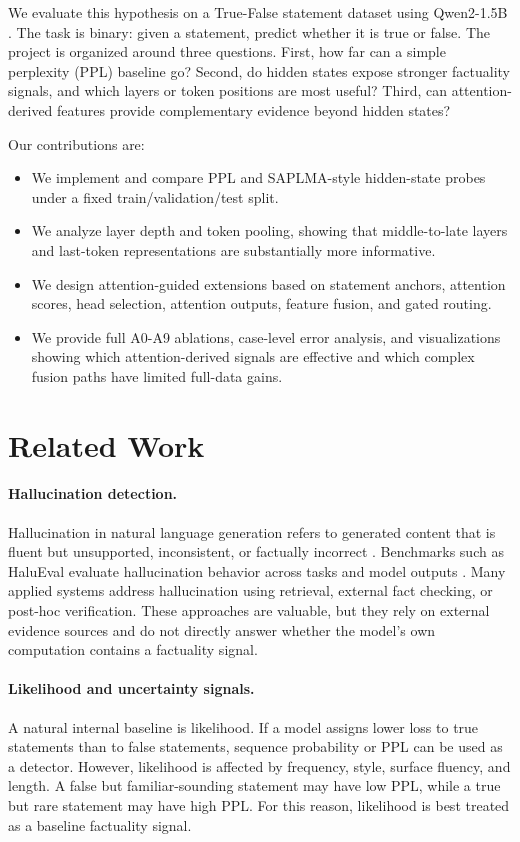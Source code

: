 \documentclass[11pt]{article}
\begin{document}
We evaluate this hypothesis on a True-False statement dataset using Qwen2-1.5B \citep{yang2024qwen2}. The task is binary: given a statement, predict whether it is true or false. The project is organized around three questions. First, how far can a simple perplexity (PPL) baseline go? Second, do hidden states expose stronger factuality signals, and which layers or token positions are most useful? Third, can attention-derived features provide complementary evidence beyond hidden states?

Our contributions are:

\begin{itemize}
  \item We implement and compare PPL and SAPLMA-style hidden-state probes under a fixed train/validation/test split.
  \item We analyze layer depth and token pooling, showing that middle-to-late layers and last-token representations are substantially more informative.
  \item We design attention-guided extensions based on statement anchors, attention scores, head selection, attention outputs, feature fusion, and gated routing.
  \item We provide full A0-A9 ablations, case-level error analysis, and visualizations showing which attention-derived signals are effective and which complex fusion paths have limited full-data gains.
\end{itemize}

\section{Related Work}

\paragraph{Hallucination detection.}
Hallucination in natural language generation refers to generated content that is fluent but unsupported, inconsistent, or factually incorrect \citep{ji2023survey}. Benchmarks such as HaluEval evaluate hallucination behavior across tasks and model outputs \citep{li2023halueval}. Many applied systems address hallucination using retrieval, external fact checking, or post-hoc verification. These approaches are valuable, but they rely on external evidence sources and do not directly answer whether the model's own computation contains a factuality signal.

\paragraph{Likelihood and uncertainty signals.}
A natural internal baseline is likelihood. If a model assigns lower loss to true statements than to false statements, sequence probability or PPL can be used as a detector. However, likelihood is affected by frequency, style, surface fluency, and length. A false but familiar-sounding statement may have low PPL, while a true but rare statement may have high PPL. For this reason, likelihood is best treated as a baseline factuality signal.
\end{document}
